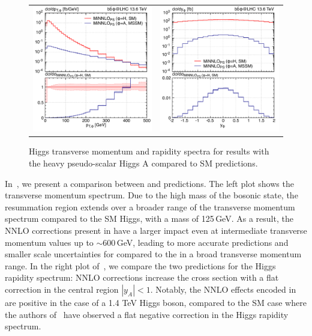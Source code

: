 \documentclass[11pt,a4paper]{article}
\begin{document}
\begin{figure}[t!]
\begin{center}
\begin{tabular}{cc}
\includegraphics[width=.45\textwidth, page=1]{plots/5fs/BSM/pt_Higgs.pdf}&
\includegraphics[width=.45\textwidth, page=1]{plots/5fs/BSM/y_Higgs.pdf}
\end{tabular}
\vspace*{1ex}
\caption{Higgs transverse momentum and rapidity spectra for \minnlo{} results with the heavy pseudo-scalar Higgs $\text{A}$ compared to SM predictions.\label{fig:SMvsBSM}}
\end{center}
\end{figure}

In~, we present a comparison between \minnlo{}  and \minlo{} predictions. 
The left plot shows the transverse momentum spectrum.
Due to the high mass of the bosonic state, the resummation region extends over a broader range of the transverse momentum spectrum compared to the SM Higgs, with a mass of 125\,GeV. As a result, the NNLO corrections present in \minnlo{} have a larger impact even at intermediate transverse momentum values up to $\sim 600$\,GeV, leading to more accurate predictions and smaller scale uncertainties for \minnlo{} compared to the \minlo{} in a broad transverse momentum range. 
In the right plot of~, we compare the two predictions for the Higgs rapidity spectrum: NNLO corrections increase the cross section with a flat correction in the central region $|y_A|<1$. Notably, the NNLO effects encoded in \minnlo{} are positive in the case of a 1.4 TeV Higgs boson, compared to the SM case where the authors of~ have observed a flat negative correction in the Higgs rapidity spectrum.
\end{document}
